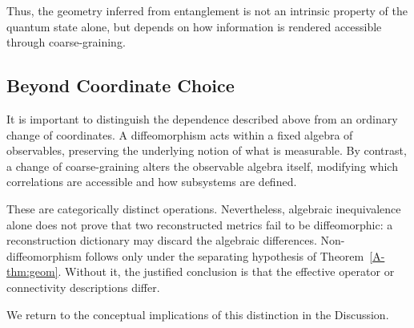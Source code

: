 \documentclass[12pt,a4paper,openany]{book}
\begin{document}
Thus, the geometry inferred from entanglement is not an intrinsic property of the quantum state alone, but depends on how information is rendered accessible through coarse-graining.

\subsection{Beyond Coordinate Choice}

It is important to distinguish the dependence described above from an ordinary change of coordinates.
A diffeomorphism acts within a fixed algebra of observables, preserving the underlying notion of what is measurable.
By contrast, a change of coarse-graining alters the observable algebra itself, modifying which correlations are accessible and how subsystems are defined.

These are categorically distinct operations.  Nevertheless, algebraic inequivalence alone does not prove that two reconstructed metrics fail to be diffeomorphic: a reconstruction dictionary may discard the algebraic differences.  Non-diffeomorphism follows only under the separating hypothesis of Theorem~\ref{A-thm:geom}.  Without it, the justified conclusion is that the effective operator or connectivity descriptions differ.

We return to the conceptual implications of this distinction in the Discussion.
\end{document}
